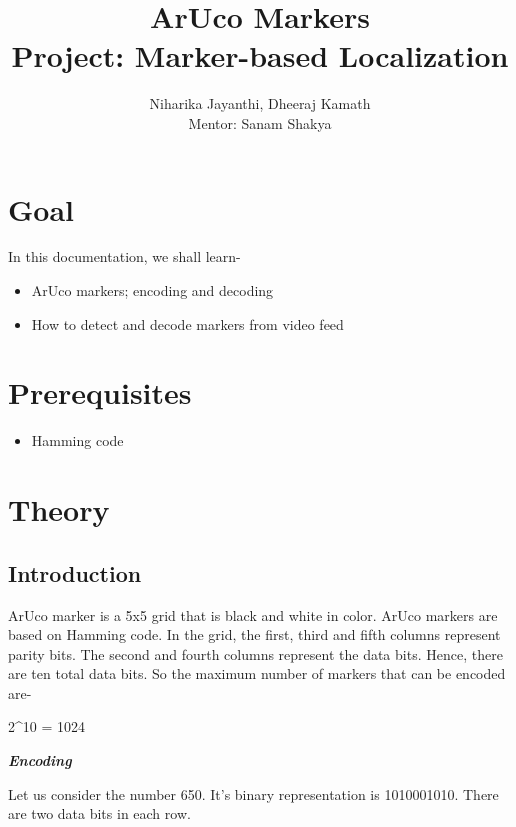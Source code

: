 \documentclass[]{article}
\date{}
\providecommand{\tightlist}{%
  \setlength{\itemsep}{0pt}\setlength{\parskip}{0pt}}
\begin{document}
	\title{\huge\textbf{ArUco Markers}\LARGE \\Project: Marker-based Localization}
	\author{Niharika Jayanthi, Dheeraj Kamath \\Mentor: Sanam Shakya}
	\maketitle
	\pagebreak
\section{Goal}\label{goal}

In this documentation, we shall learn-

\begin{itemize}
\tightlist
\item
  ArUco markers; encoding and decoding
\item
  How to detect and decode markers from video feed
\end{itemize}

\section{Prerequisites}\label{prerequisites}

\begin{itemize}
\tightlist
\item
  Hamming code
\end{itemize}

\section{Theory}\label{theory}

\subsection{Introduction}\label{introduction}

ArUco marker is a 5x5 grid that is black and white in color. ArUco
markers are based on Hamming code. In the grid, the first, third and
fifth columns represent parity bits. The second and fourth columns
represent the data bits. Hence, there are ten total data bits. So the
maximum number of markers that can be encoded are-

2\^{}10 = 1024

\emph{\textbf{Encoding}}

Let us consider the number 650. It's binary representation is
1010001010. There are two data bits in each row.
\end{document}
